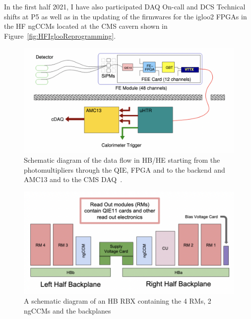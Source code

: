 In the first half 2021, I have also participated DAQ On-call and DCS Technical shifts at P5 as well as in the updating of the firmwares for the igloo2 FPGAs in the HF ngCCMs located at the CMS cavern shown in Figure~\ref{fig:HFIglooReprogramming}. 


\begin{figure}
\centering
\includegraphics[scale=0.6]{fig/CalorimeterTrigger.png}
\caption{Schematic diagram of the data flow in HB/HE starting from the photomultipliers through the QIE, FPGA and to the backend and AMC13 and to the CMS DAQ~\cite{Cooper:2016kef}.}
\label{fig:DataFlowHCAL}
\end{figure}


\begin{figure}[!htb]
	\centering
	\includegraphics[scale=0.7]{fig/RMs.png}
	\caption{A schematic diagram of an HB RBX containing the 4 RMs, 2 ngCCMs and the backplanes~\cite{Cummings_phdThesis}}
	\label{fig:ReadOutModules}
\end{figure}

